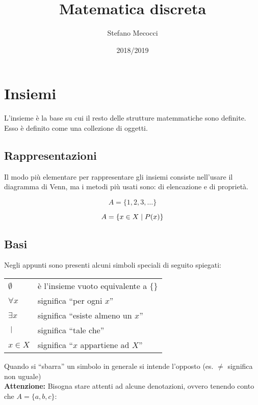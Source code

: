 \documentclass[12pt,a4paper]{article}
\title{Matematica discreta}
\author{Stefano Mecocci}
\date{2018/2019}
\newcommand{\Setsuchthat}{\;\ifnum\currentgrouptype=16 \middle\fi|\;} %
\begin{document}
  \maketitle
  \thispagestyle{empty}

  \newpage
  \tableofcontents
  \newpage

  \section{Insiemi}
  L'insieme è la base su cui il resto delle strutture matemmatiche sono definite. Esso è definito come una collezione di oggetti.

  \subsection{Rappresentazioni}
  Il modo più elementare per rappresentare gli insiemi consiste nell'usare il diagramma di Venn, ma i metodi più usati sono: di elencazione e di proprietà.

  \begin{equation}
    A = \{1, 2, 3, \ldots\}
  \end{equation}

  \begin{equation}
    A = \{x \in X \Setsuchthat P(x)\}
  \end{equation}

  \subsection{Basi}
  Negli appunti sono presenti alcuni simboli speciali di seguito spiegati:
  \begin{center}
    \begin{tabular}{p{2cm}p{10cm}}
      $ \emptyset $ & è l'insieme vuoto equivalente a $ \{\} $\\
      $ \forall x $ & significa ``per ogni $x$''\\
      $ \exists x $ & significa ``esiste almeno un $x$''\\
      $ \Setsuchthat $ & significa ``tale che''\\
      $ x \in X $ & significa ``$x$ appartiene ad $X$''\\
    \end{tabular}
  \end{center}
  Quando si ``sbarra'' un simbolo in generale si intende l'opposto (es. $ \neq $ significa
  non uguale)\\[\baselineskip]
  \textbf{Attenzione:} Bisogna stare attenti ad alcune denotazioni, ovvero tenendo conto che $ A = \{a, b, c\} $:
\end{document}
